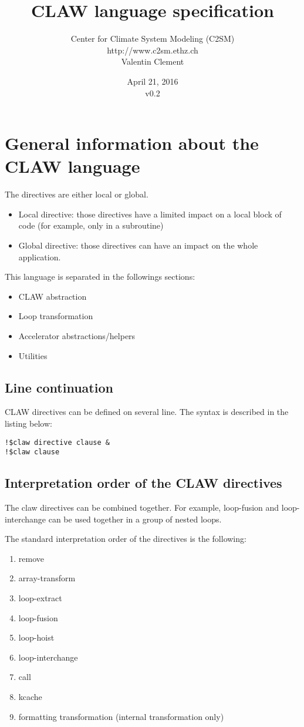\documentclass{article}
\title{CLAW language specification}
\author{Center for Climate System Modeling (C2SM)\\http://www.c2sm.ethz.ch\\Valentin Clement}
\date{April 21, 2016\\\vspace{1em}v0.2}
\begin{document}
\maketitle


\tableofcontents

\section{General information about the CLAW language}
The directives are either local or global.

\begin{itemize}
\item Local directive: those directives have a limited impact on a local block of
code (for example, only in a subroutine)
\item Global directive: those directives can have an impact on the whole
application.
\end{itemize}

This language is separated in the followings sections:
\begin{itemize}
\item CLAW abstraction
\item Loop transformation
\item Accelerator abstractions/helpers
\item Utilities
\end{itemize}

\subsection{Line continuation}
CLAW directives can be defined on several line. The syntax is described in the
listing below:

\begin{lstlisting}
!$claw directive clause &
!$claw clause
\end{lstlisting}


\subsection{Interpretation order of the CLAW directives}
The claw directives can be combined together. For example, loop-fusion and
loop-interchange can be used together in a group of nested loops.

The standard interpretation order of the directives is the following:

\begin{enumerate}
\item remove
\item array-transform
\item loop-extract
\item loop-fusion
\item loop-hoist
\item loop-interchange
\item call
\item kcache
\item formatting transformation (internal transformation only)
\end{enumerate}
\end{document}
